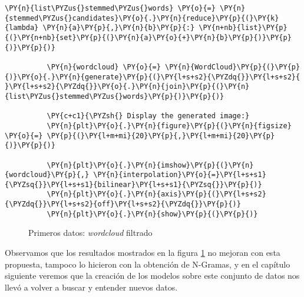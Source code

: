                   
              \begin{tcolorbox}[breakable, size=fbox, boxrule=1pt, pad at break*=1mm,colback=cellbackground, colframe=cellborder]
          \begin{Verbatim}[commandchars=\\\{\}]
          \PY{n}{list\PYZus{}stemmed\PYZus{}words} \PY{o}{=} \PY{n}{stemmed\PYZus{}candidates}\PY{o}{.}\PY{n}{reduce}\PY{p}{(}\PY{k}{lambda} \PY{n}{a}\PY{p}{,}\PY{n}{b}\PY{p}{:} \PY{n+nb}{list}\PY{p}{(}\PY{n+nb}{set}\PY{p}{(}\PY{n}{a}\PY{o}{+}\PY{n}{b}\PY{p}{)}\PY{p}{)}\PY{p}{)}
          
          \PY{n}{wordcloud} \PY{o}{=} \PY{n}{WordCloud}\PY{p}{(}\PY{p}{)}\PY{o}{.}\PY{n}{generate}\PY{p}{(}\PY{l+s+s2}{\PYZdq{}}\PY{l+s+s2}{ }\PY{l+s+s2}{\PYZdq{}}\PY{o}{.}\PY{n}{join}\PY{p}{(}\PY{n}{list\PYZus{}stemmed\PYZus{}words}\PY{p}{)}\PY{p}{)}
          
          \PY{c+c1}{\PYZsh{} Display the generated image:}
          \PY{n}{plt}\PY{o}{.}\PY{n}{figure}\PY{p}{(}\PY{n}{figsize} \PY{o}{=} \PY{p}{(}\PY{l+m+mi}{20}\PY{p}{,}\PY{l+m+mi}{20}\PY{p}{)}\PY{p}{)}
          
          \PY{n}{plt}\PY{o}{.}\PY{n}{imshow}\PY{p}{(}\PY{n}{wordcloud}\PY{p}{,} \PY{n}{interpolation}\PY{o}{=}\PY{l+s+s1}{\PYZsq{}}\PY{l+s+s1}{bilinear}\PY{l+s+s1}{\PYZsq{}}\PY{p}{)}
          \PY{n}{plt}\PY{o}{.}\PY{n}{axis}\PY{p}{(}\PY{l+s+s2}{\PYZdq{}}\PY{l+s+s2}{off}\PY{l+s+s2}{\PYZdq{}}\PY{p}{)}
          \PY{n}{plt}\PY{o}{.}\PY{n}{show}\PY{p}{(}\PY{p}{)}
          \end{Verbatim}
          \end{tcolorbox}
          
     
              
              \begin{figure}[!ht]
              	\centering
                    	\caption{Primeros datos: \textit{wordcloud} filtrado}
                    	\label{fig:wordcloudmalo2}
              \end{figure}
              
              
              
              
 Observamos que los resultados mostrados en la figura \ref{fig:wordcloudmalo2} no mejoran con esta propuesta, tampoco lo hicieron con la obtención de N-Gramas, y en el capítulo siguiente veremos que la creación de los modelos sobre este conjunto de datos nos llevó a volver a buscar y entender nuevos datos.
 
